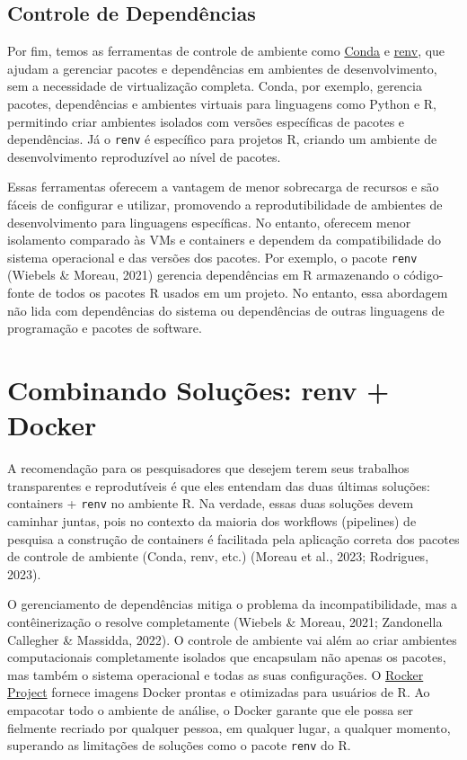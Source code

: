 \documentclass[
  a4paper,
]{book}
\begin{document}
\subsection{Controle de Dependências}\label{controle-de-dependuxeancias}

Por fim, temos as ferramentas de controle de ambiente como
\href{https://docs.conda.io/projects/conda/en/stable/}{Conda} e
\href{https://rstudio.github.io/renv/articles/renv.html}{renv}, que
ajudam a gerenciar pacotes e dependências em ambientes de
desenvolvimento, sem a necessidade de virtualização completa. Conda, por
exemplo, gerencia pacotes, dependências e ambientes virtuais para
linguagens como Python e R, permitindo criar ambientes isolados com
versões específicas de pacotes e dependências. Já o \texttt{renv} é
específico para projetos R, criando um ambiente de desenvolvimento
reproduzível ao nível de pacotes.

Essas ferramentas oferecem a vantagem de menor sobrecarga de recursos e
são fáceis de configurar e utilizar, promovendo a reprodutibilidade de
ambientes de desenvolvimento para linguagens específicas. No entanto,
oferecem menor isolamento comparado às VMs e containers e dependem da
compatibilidade do sistema operacional e das versões dos pacotes. Por
exemplo, o pacote \texttt{renv} (Wiebels \& Moreau, 2021) gerencia
dependências em R armazenando o código-fonte de todos os pacotes R
usados em um projeto. No entanto, essa abordagem não lida com
dependências do sistema ou dependências de outras linguagens de
programação e pacotes de software.

\section{Combinando Soluções: renv +
Docker}\label{combinando-soluuxe7uxf5es-renv-docker}

A recomendação para os pesquisadores que desejem terem seus trabalhos
transparentes e reprodutíveis é que eles entendam das duas últimas
soluções: containers + \texttt{renv} no ambiente R. Na verdade, essas
duas soluções devem caminhar juntas, pois no contexto da maioria dos
workflows (pipelines) de pesquisa a construção de containers é
facilitada pela aplicação correta dos pacotes de controle de ambiente
(Conda, renv, etc.) (Moreau et al., 2023; Rodrigues, 2023).

O gerenciamento de dependências mitiga o problema da incompatibilidade,
mas a contêinerização o resolve completamente (Wiebels \& Moreau, 2021;
Zandonella Callegher \& Massidda, 2022). O controle de ambiente vai além
ao criar ambientes computacionais completamente isolados que encapsulam
não apenas os pacotes, mas também o sistema operacional e todas as suas
configurações. O \href{https://rocker-project.org}{Rocker Project}
fornece imagens Docker prontas e otimizadas para usuários de R. Ao
empacotar todo o ambiente de análise, o Docker garante que ele possa ser
fielmente recriado por qualquer pessoa, em qualquer lugar, a qualquer
momento, superando as limitações de soluções como o pacote \texttt{renv}
do R.
\end{document}
